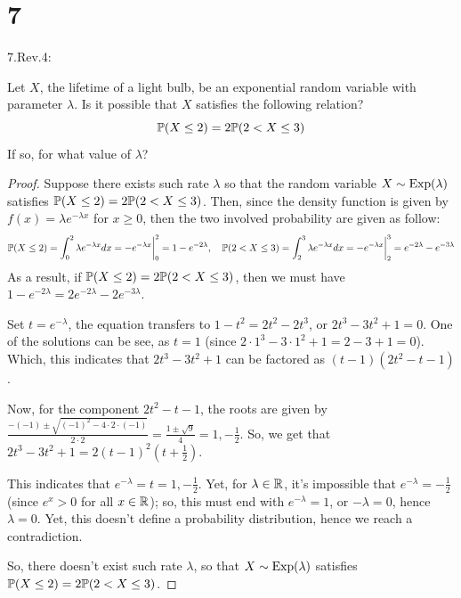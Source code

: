 \documentclass{article}
\begin{document}
\hfil

\section*{7}
\begin{ques}\label{q7}
    7.Rev.4:

    Let $X$, the lifetime of a light bulb, be an exponential random variable with parameter $\lambda$. Is it possible that $X$ satisfies the following relation?
    $$\mathbb{P}(X\leq 2) = 2\mathbb{P}(2<X\leq 3)$$
    If so, for what value of $\lambda$?
\end{ques}

\begin{proof}
    Suppose there exists such rate $\lambda$ so that the random variable $X\sim\mathrm{Exp}(\lambda)$ satisfies $\mathbb{P}(X\leq 2)=2\mathbb{P}(2<X\leq 3)$. Then, since the density function is given by $f(x)=\lambda e^{-\lambda x}$ for $x\geq 0$, then the two involved probability are given as follow:
    \begin{align}
        \mathbb{P}(X\leq 2)=\int_{0}^{2}\lambda e^{-\lambda x}dx=-e^{-\lambda x}\bigg|_{0}^{2}=1-e^{-2\lambda},\quad \mathbb{P}(2<X\leq 3)=\int_{2}^{3}\lambda e^{-\lambda x}dx = -e^{-\lambda x}\bigg|_{2}^{3}=e^{-2\lambda}-e^{-3\lambda}
    \end{align}
    As a result, if $\mathbb{P}(X\leq 2)=2\mathbb{P}(2<X\leq 3)$, then we must have $1-e^{-2\lambda}=2e^{-2\lambda}-2e^{-3\lambda}$. 
    
    Set $t=e^{-\lambda}$, the equation transfers to $1-t^2=2t^2-2t^3$, or $2t^3-3t^2+1=0$. One of the solutions can be see, as $t=1$ (since $2\cdot 1^3-3\cdot 1^2+1 = 2-3+1=0$). Which, this indicates that $2t^3-3t^2+1$ can be factored as $(t-1)(2t^2-t-1)$.

    Now, for the component $2t^2-t-1$, the roots are given by $\frac{-(-1)\pm\sqrt{(-1)^2-4\cdot 2\cdot (-1)}}{2\cdot 2} = \frac{1\pm\sqrt{9}}{4} = 1, -\frac{1}{2}$. So, we get that $2t^3-3t^2+1 = 2(t-1)^2(t+\frac{1}{2})$.

    This indicates that $e^{-\lambda}=t=1,-\frac{1}{2}$. Yet, for $\lambda\in\mathbb{R}$, it's impossible that $e^{-\lambda}=-\frac{1}{2}$ (since $e^{x}>0$ for all $x\in\mathbb{R}$); so, this must end with $e^{-\lambda}=1$, or $-\lambda=0$, hence $\lambda=0$. Yet, this doesn't define a probability distribution, hence we reach a contradiction.

    So, there doesn't exist such rate $\lambda$, so that $X\sim\mathrm{Exp}(\lambda)$ satisfies $\mathbb{P}(X\leq 2)=2\mathbb{P}(2<X\leq 3)$.
\end{proof}
\end{document}
